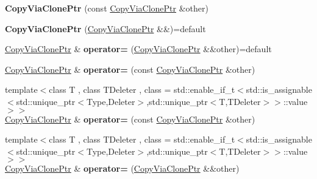 \begin{DoxyCompactItemize}
\item 
\hypertarget{classSpacy_1_1CopyViaClonePtr_a4694519f35e8a5c7f9f08fae737852a0}{}{\bfseries Copy\+Via\+Clone\+Ptr} (const \hyperlink{classSpacy_1_1CopyViaClonePtr}{Copy\+Via\+Clone\+Ptr} \&other)\label{classSpacy_1_1CopyViaClonePtr_a4694519f35e8a5c7f9f08fae737852a0}

\item 
\hypertarget{classSpacy_1_1CopyViaClonePtr_a35e601b9c2f6c8411ec82fb64f9cd41a}{}{\bfseries Copy\+Via\+Clone\+Ptr} (\hyperlink{classSpacy_1_1CopyViaClonePtr}{Copy\+Via\+Clone\+Ptr} \&\&)=default\label{classSpacy_1_1CopyViaClonePtr_a35e601b9c2f6c8411ec82fb64f9cd41a}

\item 
\hypertarget{classSpacy_1_1CopyViaClonePtr_a0d1ac4128a54264b6a6e740d1f935a52}{}\hyperlink{classSpacy_1_1CopyViaClonePtr}{Copy\+Via\+Clone\+Ptr} \& {\bfseries operator=} (\hyperlink{classSpacy_1_1CopyViaClonePtr}{Copy\+Via\+Clone\+Ptr} \&\&other)=default\label{classSpacy_1_1CopyViaClonePtr_a0d1ac4128a54264b6a6e740d1f935a52}

\item 
\hypertarget{classSpacy_1_1CopyViaClonePtr_a8ab0228048e4f3b02850454b58547eca}{}\hyperlink{classSpacy_1_1CopyViaClonePtr}{Copy\+Via\+Clone\+Ptr} \& {\bfseries operator=} (const \hyperlink{classSpacy_1_1CopyViaClonePtr}{Copy\+Via\+Clone\+Ptr} \&other)\label{classSpacy_1_1CopyViaClonePtr_a8ab0228048e4f3b02850454b58547eca}

\item 
\hypertarget{classSpacy_1_1CopyViaClonePtr_a0ed503987e8a3f477f05a500ad5c6434}{}{\footnotesize template$<$class T , class T\+Deleter , class  = std\+::enable\+\_\+if\+\_\+t$<$std\+::is\+\_\+assignable$<$std\+::unique\+\_\+ptr$<$\+Type,\+Deleter$>$,std\+::unique\+\_\+ptr$<$\+T,\+T\+Deleter$>$$>$\+::value$>$$>$ }\\\hyperlink{classSpacy_1_1CopyViaClonePtr}{Copy\+Via\+Clone\+Ptr} \& {\bfseries operator=} (const \hyperlink{classSpacy_1_1CopyViaClonePtr}{Copy\+Via\+Clone\+Ptr} \&other)\label{classSpacy_1_1CopyViaClonePtr_a0ed503987e8a3f477f05a500ad5c6434}

\item 
\hypertarget{classSpacy_1_1CopyViaClonePtr_a5437c97f8d483aed70552aa9e79f601f}{}{\footnotesize template$<$class T , class T\+Deleter , class  = std\+::enable\+\_\+if\+\_\+t$<$std\+::is\+\_\+assignable$<$std\+::unique\+\_\+ptr$<$\+Type,\+Deleter$>$,std\+::unique\+\_\+ptr$<$\+T,\+T\+Deleter$>$$>$\+::value$>$$>$ }\\\hyperlink{classSpacy_1_1CopyViaClonePtr}{Copy\+Via\+Clone\+Ptr} \& {\bfseries operator=} (\hyperlink{classSpacy_1_1CopyViaClonePtr}{Copy\+Via\+Clone\+Ptr} \&\&other)\label{classSpacy_1_1CopyViaClonePtr_a5437c97f8d483aed70552aa9e79f601f}


\end{DoxyCompactItemize}
